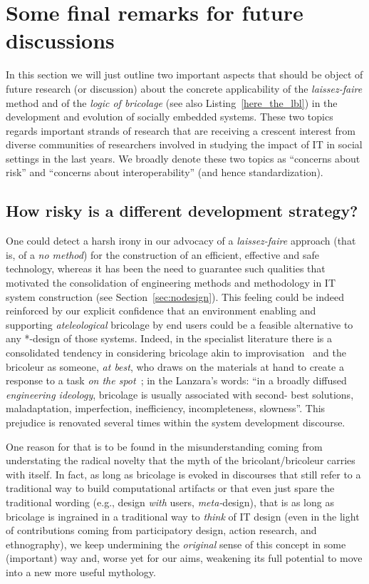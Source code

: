 \documentclass{article}
\begin{document}
\section{Some final remarks for future discussions}
\label{sec:remarks}

In this section we will just outline two important aspects that should be object of future research (or discussion) about the concrete applicability of the \emph{laissez-faire} method and of the \emph{logic of bricolage} (see also Listing~\ref{here_the_lbl}) in the development and evolution of socially embedded systems. These two topics regards important strands of research that are receiving a crescent interest from diverse communities of researchers involved in studying the impact of IT in social settings in the last years. We broadly denote these two topics as ``concerns about risk'' and ``concerns about interoperability'' (and hence standardization).

\subsection{How risky is a different development strategy?}
\label{subsec:risk}

One could detect a harsh irony in our advocacy of a \emph{laissez-faire} approach (that is, of a \emph{no method}) for the construction of an efficient, effective and safe technology, whereas it has been the need to guarantee such qualities that motivated the consolidation of engineering methods and methodology in IT system construction (see Section~\ref{sec:nodesign}). This feeling could be indeed reinforced by our explicit confidence that an environment enabling and supporting \emph{ateleological} bricolage by end users could be a feasible alternative to any *-design of those systems. Indeed, in the specialist literature there is a consolidated tendency in considering bricolage akin to improvisation~\citep{weick_organizational_1993,lanzara_between_1999} and the bricoleur as someone, \emph{at best}, who draws on the materials at hand to create a response to a task \emph{on the spot}~\citep{levi-strauss_savage_1966}; in the Lanzara's words: ``in a broadly diffused \emph{engineering ideology}, bricolage is usually associated with second- best solutions, maladaptation, imperfection, inefficiency, incompleteness, slowness''. This prejudice is renovated several times within the system development discourse. 


One reason for that is to be found in the misunderstanding coming from understating the radical novelty that the myth of the bricolant/bricoleur carries with itself. In fact, as long as bricolage is evoked in discourses that still refer to a traditional way to build computational artifacts or that even just spare the traditional wording (e.g., design \emph{with} users, \emph{meta-}design), that is as long as bricolage is ingrained in a traditional way to \emph{think} of IT design (even in the light of contributions coming from participatory design, action research, and ethnography), we keep undermining the \emph{original} sense of this concept in some (important) way and, worse yet for our aims, weakening its full potential to move into a new more useful mythology. 
\end{document}
